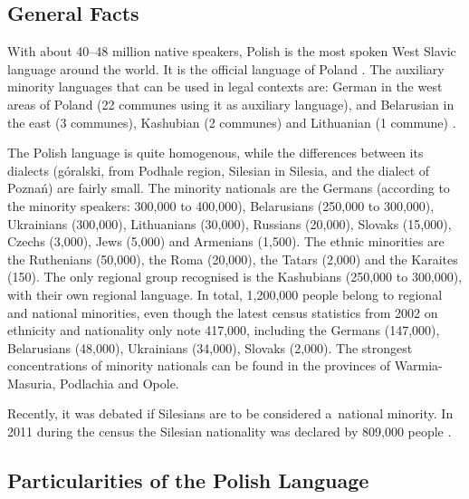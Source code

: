 
\begin{multicols}{2} 

\subsection{General Facts} 

With about 40--48 million native speakers, Polish is the most spoken
West Slavic language around the world. It is the official language of
Poland \cite{Eur1}. The auxiliary minority languages that can be used
in legal contexts are: German in the west areas of Poland (22 communes
using it as auxiliary language), and Belarusian in the east (3
communes), Kashubian (2 communes) and Lithuanian (1 commune)
\cite{Efnil1}. 


The Polish language is quite homogenous, while the differences between
its dialects (góralski, from Podhale region, Silesian in Silesia, and
the dialect of Poznań) are fairly small. The minority nationals are
the Germans (according to the minority speakers: 300,000 to 400,000),
Belarusians (250,000 to 300,000), Ukrainians (300,000), Lithuanians
(30,000), Russians (20,000), Slovaks (15,000), Czechs (3,000), Jews
(5,000) and Armenians (1,500). The ethnic minorities are the
Ruthenians (50,000), the Roma (20,000), the Tatars (2,000) and the
Karaites (150). The only regional group recognised is the Kashubians
(250,000 to 300,000), with their own regional language. In total,
1,200,000 people belong to regional and national minorities, even
though the latest census statistics from 2002 on ethnicity and
nationality only note 417,000, including the Germans (147,000),
Belarusians (48,000), Ukrainians (34,000), Slovaks (2,000). The
strongest concentrations of minority nationals can be found in the
provinces of Warmia-Masuria, Podlachia and Opole. 

Recently, it was debated if Silesians are to be considered a~national
minority. In 2011 during the census the Silesian nationality was
declared by 809,000 people \cite{gus1}. 

\subsection[Particularities of the Polish Language]{Particularities of
the Polish Language} 


\end{multicols}

